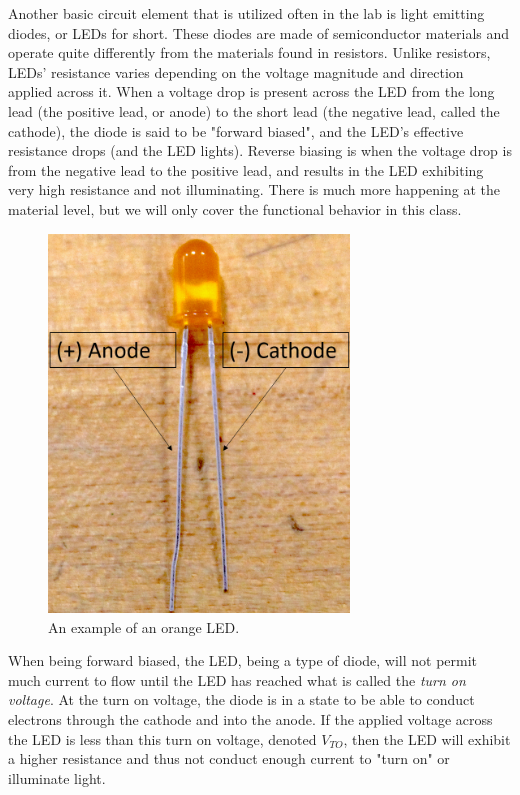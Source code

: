 \documentclass[12pt]{article}
\begin{document}
Another basic circuit element that is utilized often in the lab is light emitting diodes, or LEDs for short. These diodes are made of semiconductor materials and operate quite differently from the materials found in resistors. Unlike resistors, LEDs' resistance varies depending on the voltage magnitude and direction applied across it. When a voltage drop is present across the LED from the long lead (the positive lead, or anode) to the short lead (the negative lead, called the cathode), the diode is said to be "forward biased", and the LED's effective resistance drops (and the LED lights). Reverse biasing is when the voltage drop is from the negative lead to the positive lead, and results in the LED exhibiting very high resistance and not illuminating. There is much more happening at the material level, but we will only cover the functional behavior in this class.

\begin{figure}[H]
    \centering
    \includegraphics[width=8cm]{photos/lab/led.png}
    \caption{An example of an orange LED.}
\end{figure}

When being forward biased, the LED, being a type of diode, will not permit much current to flow until the LED has reached what is called the \textit{turn on voltage}. At the turn on voltage, the diode is in a state to be able to conduct electrons through the cathode and into the anode. If the applied voltage across the LED is less than this turn on voltage, denoted $V_{TO}$, then the LED will exhibit a higher resistance and thus not conduct enough current to "turn on" or illuminate light.
\end{document}
